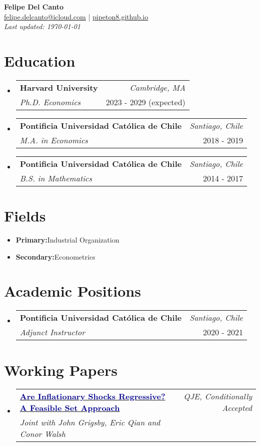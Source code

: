 \documentclass[a4paper,11pt]{article}
\makeatletter
\newcommand{\resumeItem}[2]{
  \item[]{
    \textbf{#1}{\hspace{0.5mm}#2 \vspace{-0.5mm}}
  }
}
\newcommand{\resumeSubheading}[4]{
\vspace{0.5mm}\item[]
    \begin{tabular*}{0.98\textwidth}[t]{l@{\extracolsep{\fill}}r}
        \textbf{#1} & \textit{\footnotesize{#2}} \\
        \textit{\footnotesize{#3}} &  \footnotesize{#4}\\
    \end{tabular*}
    \vspace{-1ex}
}
\newcommand{\resumeSubItem}[2]{\resumeItem{#1}{#2}\vspace{-4pt}}
\newcommand{\resumeSubHeadingListStart}{\begin{itemize}[leftmargin=*,labelsep=1mm]}
\newcommand{\resumeHeadingSkillStart}{\begin{itemize}[leftmargin=*,itemsep=1.7mm, rightmargin=2ex]}
\newcommand{\ListEnd}{\end{itemize}\vspace{-2mm}}
\newcommand{\headerfontiii}{\fontfamily{ppl}\selectfont} %
\makeatother
\begin{document}
\headerfontiii

\begin{center}
    {\Huge\textbf{Felipe Del Canto}} \\[1ex]

	\small{
    \href{mailto:felipe.delcanto@icloud.com}{felipe.delcanto@icloud.com} | 
    \href{https://pipeton8.github.io/}{pipeton8.github.io} \\[1ex]
	\textit{Last updated: \monthyeardate\today}
    }
\end{center}

\section{\textbf{Education}}
\resumeSubHeadingListStart
	\resumeSubheading
	{Harvard University}{Cambridge, MA}
	{Ph.D. Economics}{2023 - 2029 (expected)}

	\resumeSubheading
	{Pontificia Universidad Católica de Chile}{Santiago, Chile}
	{M.A. in Economics}{2018 - 2019}

	\resumeSubheading
	{Pontificia Universidad Católica de Chile}{Santiago, Chile}
	{B.S. in Mathematics}{2014 - 2017}
\ListEnd

\section{\textbf{Fields}}
\resumeHeadingSkillStart
	\resumeSubItem{Primary:}
	{Industrial Organization}
	\resumeSubItem{Secondary:}{Econometrics}
\ListEnd

\section{\textbf{Academic Positions}}
\resumeSubHeadingListStart
	\resumeSubheading
	{Pontificia Universidad Católica de Chile}{Santiago, Chile}
	{Adjunct Instructor}{2020 - 2021}
\ListEnd

\section{\textbf{Working Papers}}

\resumeSubHeadingListStart
	\resumeSubheading
	{\href{https://www.dropbox.com/scl/fi/yhdiyv3n0waeib74tnrnu/InflationRegressivity.pdf?rlkey=t9x4sb14h9fg0hzvvtp8855j2}{\textcolor{darkblue}{Are Inflationary Shocks Regressive? A Feasible Set Approach}}}
	{QJE, Conditionally Accepted}
	{Joint with John Grigsby, Eric Qian and Conor Walsh}
	{}
\ListEnd
\end{document}
